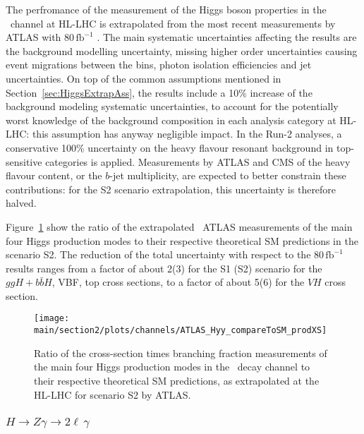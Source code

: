 The perfromance of the measurement of the Higgs boson properties in the \Hyy\ channel at HL-LHC is extrapolated from the most recent measurements by ATLAS with 80\,$\mathrm{fb}^{-1}$ \cite{ATLAS:2018uso}. The main systematic uncertainties affecting the results are the background modelling uncertainty,
missing higher order uncertainties
causing event migrations between the bins, photon isolation efficiencies and jet uncertainties.
%
On top of the common assumptions mentioned in Section~\ref{sec:HiggsExtrapAss}, the %
results include a 10\% increase of the background modeling systematic uncertainties, to account for the potentially worst knowledge of the background composition in each analysis category at HL-LHC: this assumption has anyway negligible impact.
%
In the Run-2 analyses, a conservative 100\% uncertainty on the heavy flavour resonant background in top-sensitive categories is applied. Measurements by ATLAS and CMS of the heavy flavour content, or the $b$-jet multiplicity, are expected to better constrain these contributions: for the S2 scenario extrapolation, this uncertainty is therefore halved.

Figure~\ref{fig:Hyy_ATLAS_HLLHC_S2} show the ratio of the extrapolated \Hyy\ ATLAS measurements of the main four Higgs production modes to their respective theoretical SM predictions in the scenario S2. The reduction of the total uncertainty with respect to the 80\,$\mathrm{fb}^{-1}$ results ranges from a factor of about 2(3) for the S1 (S2) scenario for the $ggH+b\bar{b}H$, VBF, top cross sections, to a factor of about 5(6) for the $VH$ cross section.

\begin{figure}
  \centering
  \texttt{[image: \\main/section2/plots/channels/ATLAS\_Hyy\_compareToSM\_prodXS]}
  \caption{Ratio of the cross-section times branching fraction measurements of the main four Higgs production modes in the \Hyy\ decay channel to their respective theoretical SM predictions, as extrapolated at the HL-LHC for scenario S2 by ATLAS.}
  \label{fig:Hyy_ATLAS_HLLHC_S2}
\end{figure}

\subsubsection{$H \to Z\gamma \to 2\ell\,\gamma$}

